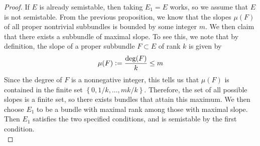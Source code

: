 \documentclass[psamsfonts, 12pt]{amsart}
\theoremstyle{definition}
\theoremstyle{remark}
\newcommand{\set}[1]{\left\lbrace #1 \right\rbrace}
\newcommand{\defeq}{\vcentcolon=}
\begin{document}
\begin{proof}
If $E$ is already semistable, then taking $E_1 = E$ works, so we assume that
$E$ is not semistable. From the previous proposition, we know that the slopes
$\mu(F)$ of all proper nontrivial subbundles is bounded by some integer $m$. We
then claim that there exists a subbundle of maximal slope. To see this, we note
that by definition, the slope of a proper subbundle $F \subset E$ of rank $k$ is
given by
\[
\mu(F) \defeq \frac{\mathrm{deg}(F)}{k} \leq m
\]
Since the degree of $F$ is a nonnegative integer, this tells us that $\mu(F)$
is contained in the finite set $\set{0, 1/k, \ldots, mk/k}$. Therefore, the set
of all possible slopes is a finite set, so there exists bundles that attain this
maximum. We then choose $E_1$ to be a bundle with maximal rank among those with
maximal slope. Then $E_1$ satisfies the two specified conditions, and is semistable
by the first condition. \\


\end{proof}
\end{document}

